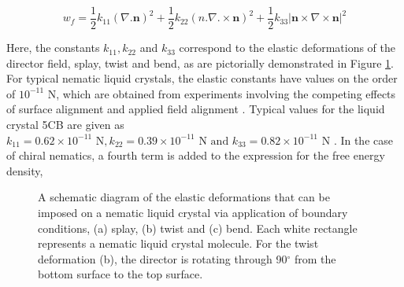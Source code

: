 \begin{equation}
w_f=\frac{1}{2}k_{11}\left(\nabla.\bm{n}\right)^2+\frac{1}{2}k_{22}\left(n.\nabla.\times\bm{n}\right)^2+\frac{1}{2}k_{33}\left|\bm{n}\times\nabla\times\bm{n}\right|^2
\label{eq:Free_energy}
\end{equation}

Here, the constants $k_{11},k_{22}$ and $k_{33}$ correspond to the elastic deformations of the director field, splay, twist and bend, as are pictorially demonstrated in Figure \ref{fig:s,t,b}. For typical nematic liquid crystals, the elastic constants have values on the order of $10^{-11}$ N, which are obtained from experiments involving the competing effects of surface alignment and applied field alignment \citep{Vertogen1988}. Typical values for the liquid crystal 5CB are given as $k_{11}=0.62\times10^{-11} \text{ N},k_{22}=0.39\times10^{-11} \text{ N}\text{ and }k_{33}=0.82\times10^{-11} \text{ N}$ \cite{Stewart2004}. In the case of chiral nematics, a fourth term is added to the expression for the free energy density,

\begin{figure}
\begin{center}
\hspace{0.2cm}
\hspace{0.2cm}
\hspace{0.2cm}
\end{center}
\caption[Schematic depiction of the splay, twist and bend elastic deformations]{\label{fig:s,t,b}A schematic diagram of the elastic deformations that can be imposed on a nematic liquid crystal via application of boundary conditions, (a) splay, (b) twist and (c) bend. Each white rectangle represents a nematic liquid crystal molecule. For the twist deformation (b), the director is rotating through 90$^{\circ}$ from the bottom surface to the top surface.}
\end{figure}



